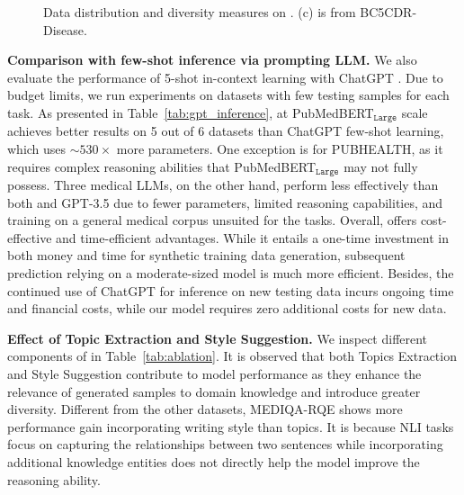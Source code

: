 \begin{figure*}[tp]
	\centering
	\vspace{-1ex}
         \hspace{-1.5ex}
 \hspace{-1.5ex}
	\caption{Data distribution and diversity measures on {\ours}. (c) is from BC5CDR-Disease.\vspace{-2ex}}
	\vspace{-1.5ex}
\label{fig:quality_ana2}
\end{figure*}

\noindent  \textbf{Comparison with few-shot inference via prompting LLM.}
We also evaluate the performance of 5-shot in-context learning with ChatGPT . Due to budget limits, we  run experiments on datasets with few testing samples for each task. 
As presented in Table~\ref{tab:gpt_inference}, {\ours} at PubMedBERT$_{\texttt{Large}}$ scale achieves better results on 5 out of 6 datasets than ChatGPT few-shot learning, which uses $\sim 530 \times$ more parameters. 
One exception is for PUBHEALTH, as it requires complex reasoning abilities that PubMedBERT$_{\texttt{Large}}$ may not fully possess. 
Three medical LLMs, on the other hand, perform less effectively than both {\ours} and GPT-3.5 due to fewer parameters, limited reasoning capabilities, and training on a general medical corpus unsuited for the tasks.
Overall, {\ours} offers cost-effective and time-efficient advantages. 
While it entails a one-time investment in both money and time for synthetic training data generation, subsequent prediction relying on a moderate-sized model is much more efficient. 
Besides, the continued use of ChatGPT for inference on new testing data 
incurs ongoing time and financial costs, while our model requires zero additional costs for new data. 

\noindent \textbf{Effect of Topic Extraction and Style Suggestion.}
We inspect different components of {\ours} in Table~\ref{tab:ablation}. It is observed that both Topics Extraction and Style Suggestion contribute to model performance as they enhance the relevance of generated samples to domain knowledge and introduce greater diversity. Different from the other datasets, MEDIQA-RQE shows more performance gain incorporating writing style than topics. It is because NLI tasks focus on capturing the relationships between two sentences while incorporating additional knowledge entities does not directly help the model improve the reasoning ability.

